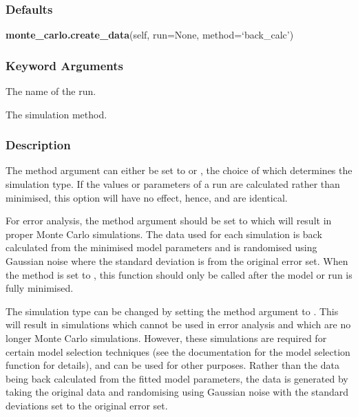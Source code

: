   
 \subsubsection{Defaults} 

 \textsf{\textbf{monte\_carlo.create\_data}(self, run=None, method=`back\_calc')} 

  
 \subsubsection{Keyword Arguments} 

   The name of the run.   

   The simulation method.  

  

  
 \subsubsection{Description} 

 The method argument can either be set to  or , the choice of which determines the simulation type.  If the values or parameters of a run are calculated rather than minimised, this option will have no effect, hence,  and  are identical. 
  

 For error analysis, the method argument should be set to  which will result in proper Monte Carlo simulations.  The data used for each simulation is back calculated from the minimised model parameters and is randomised using Gaussian noise where the standard deviation is from the original error set.  When the method is set to , this function should only be called after the model or run is fully minimised. 
  

 The simulation type can be changed by setting the method argument to .  This will result in simulations which cannot be used in error analysis and which are no longer Monte Carlo simulations.  However, these simulations are required for certain model selection techniques (see the documentation for the model selection function for details), and can be used for other purposes.  Rather than the data being back calculated from the fitted model parameters, the data is generated by taking the original data and randomising using Gaussian noise with the standard deviations set to the original error set. 
  


